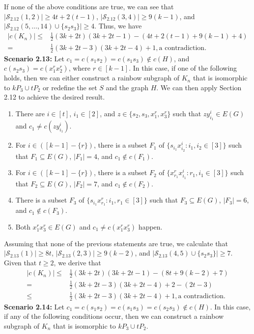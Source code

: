\documentclass[12pt]{article}
\begin{document}
 If none of the above conditions are true, we can see that \( |\mathcal{S}_{2.12}(1,2)| \geq 4t + 2(t - 1) \), \( |\mathcal{S}_{2.12}(3,4)| \geq 9(k - 1) \), and \( |\mathcal{S}_{2.12}(5,\ldots,14) \cup \{s_2s_3\}| \geq 4 \). Thus, we have
  \begin{align*}
  |c(K_n)|\leq & \frac{1}{2}(3k+2t)(3k+2t-1)-(4t+2(t-1)+9(k-1)+4)\\
  =&\frac{1}{2}(3k+2t-3)(3k+2t-4)+1, \text{a contradiction}.
\end{align*}
{\bf Scenario 2.13:} Let \(c_1=c(s_1s_2)=c(s_1s_3) \notin c(H)\), and \( c(s_2s_3) = c(x^r_1x^r_2)\), where \(r \in [k-1]\).
 In this case, if one of the following holds, then we can either construct a rainbow subgraph of \(K_n\) that is isomorphic to \(kP_3 \cup tP_2\) or redefine the set \(S\) and the graph \(H\). We can then apply Section 2.12 to achieve the desired result.
  \begin{enumerate}
 \item There are $i\in[t]$, $i_1\in[2]$, and $z\in\{s_2,s_3,x^r_1,x^r_3\}$ such that $zy^i_{i_1}\in E(G)$ and $c_1\neq c(zy^i_{i_1})$.
 \item For $i\in([k-1]-\{r\})$, there is a subset $F_1$ of $\{s_{i_1}x^i_{i_2}:i_1,i_2\in[3]\}$ such that $F_1\subseteq E(G)$, $|F_1|=4$, and $c_1\not\in c(F_1)$.
  \item For $i\in([k-1]-\{r\})$, there is a subset $F_2$ of $\{x^r_{r_1}x^i_{i_1}:r_1,i_1\in[3]\}$ such that $F_2\subseteq E(G)$, $|F_2|=7$, and $c_1\not\in c(F_2)$.
  \item There is a subset $F_3$ of $\{s_{i_1}x^r_{r_1}:i_1,r_1\in[3]\}$ such that $F_3\subseteq E(G)$, $|F_3|=6$, and $c_1\not\in c(F_3)$.
  \item Both $x_1^rx_3^r\in E(G)$ and $c_1\neq c(x_1^rx_3^r)$ happen.
 \end{enumerate}
 Assuming that none of the previous statements are true, we calculate that \( |\mathcal{S}_{2.13}(1)| \geq 8t \), \( |\mathcal{S}_{2.13}(2,3)| \geq 9(k - 2) \), and \( |\mathcal{S}_{2.13}(4,5) \cup \{s_2s_3\}| \geq 7 \). Given that \( t \geq 2 \), we derive that
  \begin{align*}
  |c(K_n)|\leq & \frac{1}{2}(3k+2t)(3k+2t-1)-(8t+9(k-2)+7)\\
  =&\frac{1}{2}(3k+2t-3)(3k+2t-4)+2-(2t-3)\\
  \leq& \frac{1}{2}(3k+2t-3)(3k+2t-4)+1,\text{a contradiction}.
\end{align*}
{\bf Scenario 2.14:} Let \(c_1 = c(s_1s_2) = c(s_1s_3) = c(s_2s_3) \notin c(H)\). In this case, if any of the following conditions occur, then we can construct a rainbow subgraph of \(K_n\) that is isomorphic to \(kP_3 \cup tP_2\).
\end{document}
